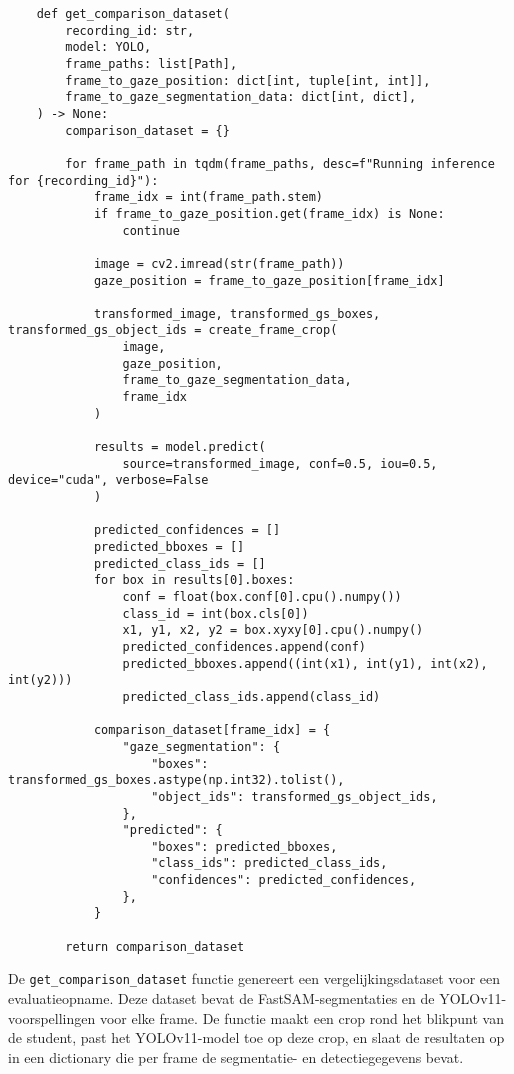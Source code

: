 \begin{listing}[H]
  \fontsize{10pt}{9.6pt}
  \begin{verbatim}
    def get_comparison_dataset(
        recording_id: str,
        model: YOLO,
        frame_paths: list[Path],
        frame_to_gaze_position: dict[int, tuple[int, int]],
        frame_to_gaze_segmentation_data: dict[int, dict],
    ) -> None:
        comparison_dataset = {}
        
        for frame_path in tqdm(frame_paths, desc=f"Running inference for {recording_id}"):
            frame_idx = int(frame_path.stem)
            if frame_to_gaze_position.get(frame_idx) is None:
                continue

            image = cv2.imread(str(frame_path))
            gaze_position = frame_to_gaze_position[frame_idx]

            transformed_image, transformed_gs_boxes, transformed_gs_object_ids = create_frame_crop(
                image,
                gaze_position,
                frame_to_gaze_segmentation_data,
                frame_idx
            )

            results = model.predict(
                source=transformed_image, conf=0.5, iou=0.5, device="cuda", verbose=False
            )

            predicted_confidences = []
            predicted_bboxes = []
            predicted_class_ids = []
            for box in results[0].boxes:
                conf = float(box.conf[0].cpu().numpy())
                class_id = int(box.cls[0])
                x1, y1, x2, y2 = box.xyxy[0].cpu().numpy()
                predicted_confidences.append(conf)
                predicted_bboxes.append((int(x1), int(y1), int(x2), int(y2)))
                predicted_class_ids.append(class_id)

            comparison_dataset[frame_idx] = {
                "gaze_segmentation": {
                    "boxes": transformed_gs_boxes.astype(np.int32).tolist(),
                    "object_ids": transformed_gs_object_ids,
                },
                "predicted": {
                    "boxes": predicted_bboxes,
                    "class_ids": predicted_class_ids,
                    "confidences": predicted_confidences,
                },
            }

        return comparison_dataset
  \end{verbatim}
  \caption[Functie voor het creëren van vergelijkingsdataset voor een evaluatieopname]{
    \label{listing:get-comparison-set}
    De \texttt{get\_comparison\_dataset} functie genereert een vergelijkingsdataset voor een evaluatieopname.
    Deze dataset bevat de FastSAM-segmentaties en de YOLOv11-voorspellingen voor elke frame.
    De functie maakt een crop rond het blikpunt van de student, past het YOLOv11-model toe op deze crop,
    en slaat de resultaten op in een dictionary die per frame de segmentatie- en detectiegegevens bevat.
    }
\end{listing}

